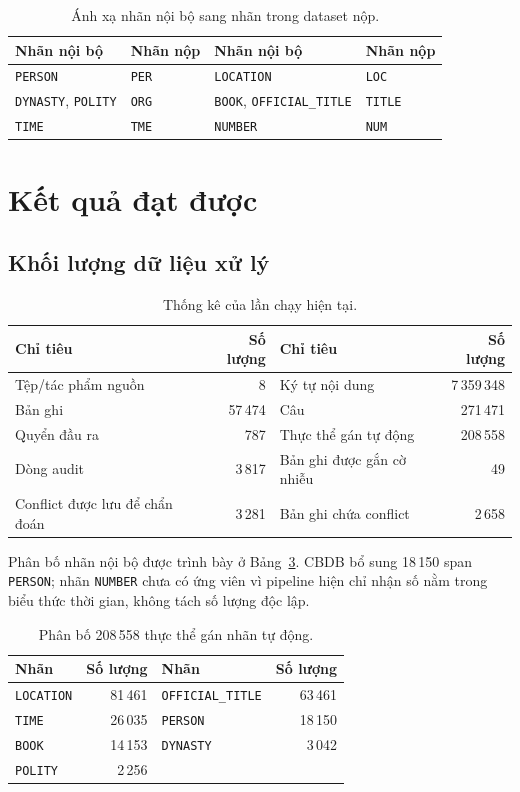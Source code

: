 \documentclass[11pt,a4paper]{article}
\begin{document}
\begin{table}[ht]
\centering
\caption{Ánh xạ nhãn nội bộ sang nhãn trong dataset nộp.}
\label{tab:mapping}
\small
\begin{tabular}{ll@{\qquad}ll}
\toprule
Nhãn nội bộ & Nhãn nộp & Nhãn nội bộ & Nhãn nộp \\
\midrule
\texttt{PERSON} & \texttt{PER} & \texttt{LOCATION} & \texttt{LOC} \\
\texttt{DYNASTY}, \texttt{POLITY} & \texttt{ORG} &
\texttt{BOOK}, \texttt{OFFICIAL\_TITLE} & \texttt{TITLE} \\
\texttt{TIME} & \texttt{TME} & \texttt{NUMBER} & \texttt{NUM} \\
\bottomrule
\end{tabular}
\end{table}

\section{Kết quả đạt được}

\subsection{Khối lượng dữ liệu xử lý}

\begin{table}[ht]
\centering
\caption{Thống kê của lần chạy hiện tại.}
\label{tab:stats}
\small
\begin{tabular}{lr@{\qquad}lr}
\toprule
Chỉ tiêu & Số lượng & Chỉ tiêu & Số lượng \\
\midrule
Tệp/tác phẩm nguồn & 8 & Ký tự nội dung & 7\,359\,348 \\
Bản ghi & 57\,474 & Câu & 271\,471 \\
Quyển đầu ra & 787 & Thực thể gán tự động & 208\,558 \\
Dòng audit & 3\,817 & Bản ghi được gắn cờ nhiễu & 49 \\
Conflict được lưu để chẩn đoán & 3\,281 & Bản ghi chứa conflict & 2\,658 \\
\bottomrule
\end{tabular}
\end{table}

Phân bố nhãn nội bộ được trình bày ở Bảng~\ref{tab:labels}. CBDB bổ sung
18\,150 span \texttt{PERSON}; nhãn \texttt{NUMBER} chưa có ứng viên vì pipeline
hiện chỉ nhận số nằm trong biểu thức thời gian, không tách số lượng độc lập.

\begin{table}[ht]
\centering
\caption{Phân bố 208\,558 thực thể gán nhãn tự động.}
\label{tab:labels}
\small
\begin{tabular}{lr@{\qquad}lr}
\toprule
Nhãn & Số lượng & Nhãn & Số lượng \\
\midrule
\texttt{LOCATION} & 81\,461 & \texttt{OFFICIAL\_TITLE} & 63\,461 \\
\texttt{TIME} & 26\,035 & \texttt{PERSON} & 18\,150 \\
\texttt{BOOK} & 14\,153 & \texttt{DYNASTY} & 3\,042 \\
\texttt{POLITY} & 2\,256 & & \\
\bottomrule
\end{tabular}
\end{table}
\end{document}
